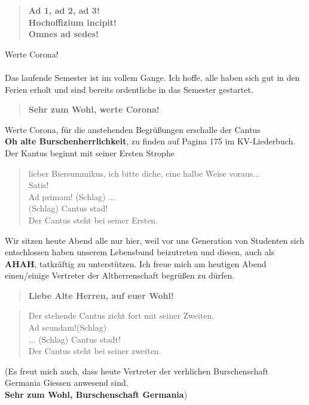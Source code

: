 \begin{quote}
    \textbf{Ad 1, ad 2, ad 3!}\\
    \textbf{Hochoffizium incipit!}\\
    \textbf{Omnes ad sedes!}
\end{quote}

Werte Corona!\\ \\
Das laufende Semester ist im vollem Gange. Ich hoffe, alle haben sich
gut in den Ferien erholt und sind bereits ordentliche in das Semester 
gestartet.
\begin{quote}
    \textbf{Sehr zum Wohl, werte Corona!}
\end{quote}

Werte Corona, für die anstehenden Begrüßungen erschalle der Cantus \\
\textbf{Oh alte Burschenherrlichkeit}, zu finden auf Pagina 175
im KV-Liederbuch. Der Kantus beginnt mit seiner Ersten Strophe

\begin{quote}
    lieber Biersummikus, ich bitte diche, eine halbe Weise voraus...\\
    Satis!\\
    Ad primam! (Schlag)
    ...\\
    (Schlag) Cantus stad!\\
    Der Cantus steht bei seiner Ersten.\\
\end{quote}

Wir sitzen heute Abend alle nur hier, weil vor uns Generation von Studenten sich 
entschlossen haben unserem Lebensbund beizutreten und diesen, auch als 
\textbf{AHAH}, tatkräftig zu unterstützen. Ich freue mich am heutigen 
Abend einen/einige Vertreter der Altherrenschaft begrüßen zu dürfen.

\begin{quote}
    \textbf{Liebe Alte Herren, auf euer Wohl!}
\end{quote}
\begin{quote}
    Der stehende Cantus zieht fort mit seiner Zweiten.\\
    Ad scundam!(Schlag)\\
    ...
    (Schlag) Cantus stadt!\\
    Der Cantus steht bei seiner zweiten.
\end{quote}
(Es freut mich auch, dass heute Vertreter der verhlichen
Burschenschaft Germania Giessen anwesend sind.\\
\textbf{Sehr zum Wohl, Burschenschaft Germania})

